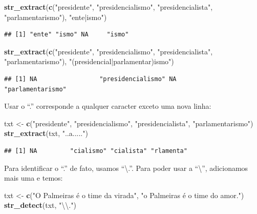 \documentclass[]{book}
\newenvironment{Shaded}{\begin{snugshade}}{\end{snugshade}}
\newcommand{\CharTok}[1]{\textcolor[rgb]{0.31,0.60,0.02}{#1}}
\newcommand{\KeywordTok}[1]{\textcolor[rgb]{0.13,0.29,0.53}{\textbf{#1}}}
\newcommand{\NormalTok}[1]{#1}
\newcommand{\StringTok}[1]{\textcolor[rgb]{0.31,0.60,0.02}{#1}}
\begin{document}
\begin{Shaded}
\begin{Highlighting}[]
\KeywordTok{str_extract}\NormalTok{(}\KeywordTok{c}\NormalTok{(}\StringTok{"presidente"}\NormalTok{, }\StringTok{"presidencialismo"}\NormalTok{, }\StringTok{"presidencialista"}\NormalTok{, }\StringTok{"parlamentarismo"}\NormalTok{), }\StringTok{"ente|ismo"}\NormalTok{)}
\end{Highlighting}
\end{Shaded}

\begin{verbatim}
## [1] "ente" "ismo" NA     "ismo"
\end{verbatim}

\begin{Shaded}
\begin{Highlighting}[]
\KeywordTok{str_extract}\NormalTok{(}\KeywordTok{c}\NormalTok{(}\StringTok{"presidente"}\NormalTok{, }\StringTok{"presidencialismo"}\NormalTok{, }\StringTok{"presidencialista"}\NormalTok{, }\StringTok{"parlamentarismo"}\NormalTok{), }\StringTok{"(presidencial|parlamentar)ismo"}\NormalTok{)}
\end{Highlighting}
\end{Shaded}

\begin{verbatim}
## [1] NA                 "presidencialismo" NA                 "parlamentarismo"
\end{verbatim}

Usar o ``.'' corresponde a qualquer caracter exceto uma nova linha:

\begin{Shaded}
\begin{Highlighting}[]
\NormalTok{txt <-}\StringTok{ }\KeywordTok{c}\NormalTok{(}\StringTok{"presidente"}\NormalTok{, }\StringTok{"presidencialismo"}\NormalTok{, }\StringTok{"presidencialista"}\NormalTok{, }\StringTok{"parlamentarismo"}\NormalTok{)}
\KeywordTok{str_extract}\NormalTok{(txt, }\StringTok{"..a....."}\NormalTok{)}
\end{Highlighting}
\end{Shaded}

\begin{verbatim}
## [1] NA         "cialismo" "cialista" "rlamenta"
\end{verbatim}

Para identificar o ``.'' de fato, usamos ``\textbackslash{}.''. Para poder usar a ``\textbackslash{}'', adicionamos mais uma e temos:

\begin{Shaded}
\begin{Highlighting}[]
\NormalTok{txt <-}\StringTok{ }\KeywordTok{c}\NormalTok{(}\StringTok{"O Palmeiras é o time da virada"}\NormalTok{, }\StringTok{"o Palmeiras é o time do amor."}\NormalTok{)}
\KeywordTok{str_detect}\NormalTok{(txt, }\StringTok{"}\CharTok{\textbackslash{}\textbackslash{}}\StringTok{."}\NormalTok{)}
\end{Highlighting}
\end{Shaded}
\end{document}
